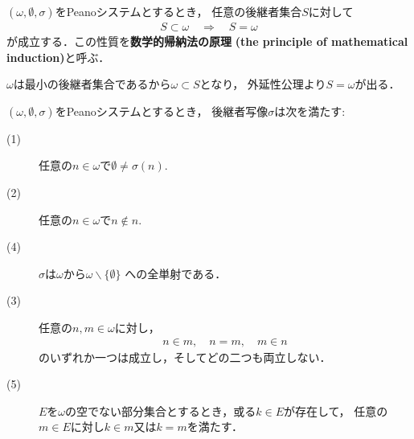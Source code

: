	\begin{screen}
		\begin{thm}[数学的帰納法の原理]
		\label{thm:the_principle_of_mathematical_induction}
			$(\omega,\emptyset,\sigma)$をPeanoシステムとするとき，
			任意の後継者集合$S$に対して
			\begin{align}
				S \subset \omega \quad \Longrightarrow \quad S = \omega
			\end{align}
			が成立する．この性質を{\bf 数学的帰納法の原理}
			{\bf (the principle of mathematical induction)}と呼ぶ．
		\end{thm}
	\end{screen}
	
	\begin{prf}
		$\omega$は最小の後継者集合であるから$\omega \subset S$となり，
		外延性公理より$S = \omega$が出る．
		\QED
	\end{prf}
	
	\begin{screen}
		\begin{thm}[後継者写像は全単射]
		\label{thm:successor_mapping_is_injective}
			$(\omega,\emptyset,\sigma)$をPeanoシステムとするとき，
			後継者写像$\sigma$は次を満たす:
			\begin{description}
				\item[(1)] 任意の$n \in \omega$で$\emptyset \neq \sigma(n)$.
				\item[(2)] 任意の$n \in \omega$で$n \notin n$.
				\item[(4)] $\sigma$は$\omega$から$\omega \backslash \{\emptyset\}$
					への全単射である．
				
				\item[(3)] 任意の$n,m \in \omega$に対し，
					\begin{align}
						n \in m,\quad n = m,\quad m \in n
					\end{align}
					のいずれか一つは成立し，そしてどの二つも両立しない．
				\item[(5)] $E$を$\omega$の空でない部分集合とするとき，或る$k \in E$が存在して，
					任意の$m \in E$に対し$k \in m$又は$k = m$を満たす．
			\end{description}
		\end{thm}
	\end{screen}
	
